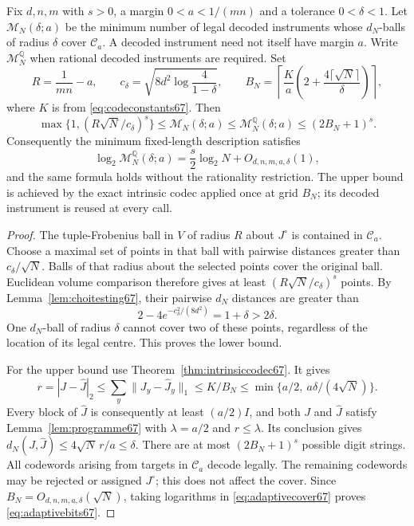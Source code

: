 \begin{theorem}\label{thm:adaptiveentropy67}
Fix $d,n,m$ with $s>0$, a margin $0<a<1/(mn)$ and a tolerance
$0<\delta<1$. Let $\mathcal M_N(\delta;a)$ be the minimum number of
legal decoded instruments whose $d_N$-balls of radius $\delta$ cover
$\mathcal C_a$. A decoded instrument need not itself have margin $a$.
Write $\mathcal M_N^{\mathbb Q}$ when rational decoded instruments are
required. Set
\[
 R=\frac1{mn}-a,\qquad
 c_\delta=\sqrt{8d^2\log\frac4{1-\delta}},\qquad
 B_N=\left\lceil\frac Ka\left(2+
                         \frac{4\lceil\sqrt N\rceil}{\delta}\right)\right\rceil,
\]
where $K$ is from \eqref{eq:codeconstants67}. Then
\begin{equation}\label{eq:adaptivecover67}
 \max\{1,(R\sqrt N/c_\delta)^s\}
 \le\mathcal M_N(\delta;a)
 \le\mathcal M_N^{\mathbb Q}(\delta;a)
 \le(2B_N+1)^s.
\end{equation}
Consequently the minimum fixed-length description satisfies
\begin{equation}\label{eq:adaptivebits67}
 \log_2\mathcal M_N^{\mathbb Q}(\delta;a)
       =\frac s2\log_2N+O_{d,n,m,a,\delta}(1),
\end{equation}
and the same formula holds without the rationality restriction.
The upper bound is achieved by the exact intrinsic codec applied once
at grid $B_N$; its decoded instrument is reused at every call.
\end{theorem}
\begin{proof}
The tuple-Frobenius ball in $V$ of radius $R$ about $J^\circ$ is
contained in $\mathcal C_a$. Choose a maximal set of points in that
ball with pairwise distances greater than $c_\delta/\sqrt N$.
Balls of that radius about the selected points cover the original
ball. Euclidean volume comparison therefore gives at least
$(R\sqrt N/c_\delta)^s$ points. By Lemma~\ref{lem:choitesting67}, their
pairwise $d_N$ distances are greater than
\[
 2-4e^{-c_\delta^2/(8d^2)}=1+\delta>2\delta.
\]
One $d_N$-ball of radius $\delta$ cannot cover two of these points,
regardless of the location of its legal centre. This proves the lower
bound.

For the upper bound use Theorem~\ref{thm:intrinsiccodec67}. It gives
\[
 r=|J-\widehat J|_2\le\sum_y\|J_y-\widehat J_y\|_1
 \le K/B_N\le\min\{a/2,\ a\delta/(4\sqrt N)\}.
\]
Every block of $\widehat J$ is consequently at least $(a/2)I$, and
both $J$ and $\widehat J$ satisfy Lemma~\ref{lem:programme67} with
$\lambda=a/2$ and $r\le\lambda$. Its conclusion gives
$d_N(J,\widehat J)\le4\sqrt N\,r/a\le\delta$.
There are at most $(2B_N+1)^s$ possible digit strings. All codewords
arising from targets in $\mathcal C_a$ decode legally. The remaining
codewords may be rejected or assigned $J^\circ$; this does not affect
the cover. Since $B_N=O_{d,n,m,a,\delta}(\sqrt N)$, taking logarithms
in \eqref{eq:adaptivecover67} proves \eqref{eq:adaptivebits67}.
\end{proof}

